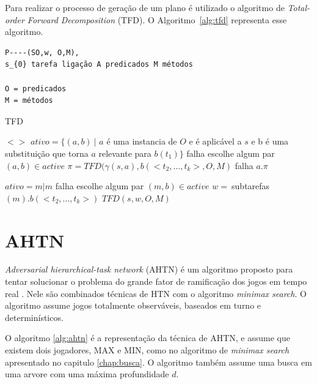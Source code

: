 Para realizar o processo de geração de um plano é utilizado o algoritmo de \textit{Total-order Forward Decomposition} (TFD). O Algoritmo~\ref{alg:tfd} representa esse algoritmo.

\begin{verbatim}
P----(SO,w, O,M),
s_{0} tarefa ligação A predicados M métodos 

O = predicados
M = métodos
\end{verbatim}

\begin{algorithm}
	\caption{TFD}
	\label{alg:tfd}
	\begin{algorithmic}[1]		
				\State	\Return $<>$
			\EndIf
				\State $ativo = \{(a, b)~ |$ $a$ é uma instancia de $O$ e é aplicável a $s$ e b é uma substituição que torna $a$ relevante para $b(t_{1})\}$
					\State \Return falha
				\EndIf
				\State escolhe algum par $(a, b) \in active$
				\State $\pi = TFD(\gamma(s, a), b(<t_{2}, ..., t_{k}>, O, M)$
					\State \Return falha
				\Else 
					\State \Return $a . \pi$
			\EndIf
			
				\State $ativo = {m | m }$
					\State \Return falha
				\EndIf
				\State escolhe algum par $(m, b) \in active$
				\State $w =~ $subtarefas$(m).b(<t_{2}, ..., t_{k}>)$
				\State \Return $TFD(s, w, O, M)$
				\EndIf
		\EndFunction
	\end{algorithmic}
\end{algorithm}
\section{AHTN} 

\textit{Adversarial hierarchical-task network} (AHTN) é um algoritmo proposto para tentar solucionar o problema do grande fator de ramificação dos jogos em tempo real \cite{ontanon2015adversarial}. Nele são combinados técnicas de HTN com o algoritmo \textit{minimax search}. O algoritmo assume jogos totalmente observáveis, baseados em turno e determinísticos.

O algoritmo \ref{alg:ahtn} \cite{ontanon2015adversarial} é a representação da técnica de AHTN, e assume que existem dois jogadores, MAX e MIN, como no algoritmo de \textit{minimax search} apresentado no capitulo \ref{chap:busca}. O algoritmo também assume uma busca em uma arvore com uma máxima profundidade $d$.

